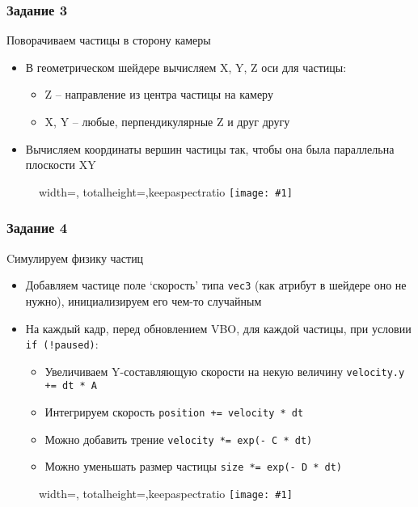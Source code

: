 \documentclass{beamer}
\newcommand{\slideimage}[1]{
  \begin{figure}
    \begin{adjustbox}{width=\textwidth, totalheight=\textheight-2\baselineskip-2\baselineskip,keepaspectratio}
      \texttt{[image: \#1]}
    \end{adjustbox}
  \end{figure}
}
\begin{document}
\begin{frame}[fragile]
\frametitle{Задание 3}
Поворачиваем частицы в сторону камеры
\begin{itemize}
\item В геометрическом шейдере вычисляем X, Y, Z оси для частицы:
\begin{itemize}
\item Z -- направление из центра частицы на камеру
\item X, Y -- любые, перпендикулярные Z и друг другу
\end{itemize}
\item Вычисляем координаты вершин частицы так, чтобы она была параллельна плоскости XY
\end{itemize}
\end{frame}

\begin{frame}[fragile]
\slideimage{3.png}
\end{frame}

\begin{frame}[fragile]
\frametitle{Задание 4}
Cимулируем физику частиц
\begin{itemize}
\item Добавляем частице поле `скорость' типа \verb|vec3| (как атрибут в шейдере оно не нужно), инициализируем его чем-то случайным
\item На каждый кадр, перед обновлением VBO, для каждой частицы, при условии \verb|if (!paused)|:
\begin{itemize}
\item Увеличиваем Y-составляющую скорости на некую величину \verb|velocity.y += dt * A|
\item Интегрируем скорость \verb|position += velocity * dt|
\item Можно добавить трение \verb|velocity *= exp(- C * dt)|
\item Можно уменьшать размер частицы \verb|size *= exp(- D * dt)|
\end{itemize}
\end{itemize}
\end{frame}

\begin{frame}[fragile]
\slideimage{4.png}
\end{frame}
\end{document}
